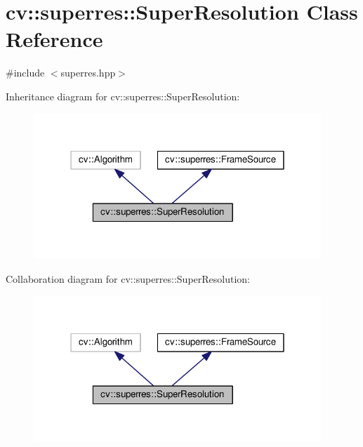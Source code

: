 \hypertarget{classcv_1_1superres_1_1SuperResolution}{\section{cv\-:\-:superres\-:\-:Super\-Resolution Class Reference}
\label{classcv_1_1superres_1_1SuperResolution}
}


{\ttfamily \#include $<$superres.\-hpp$>$}



Inheritance diagram for cv\-:\-:superres\-:\-:Super\-Resolution\-:\nopagebreak
\begin{figure}[H]
\begin{center}
\leavevmode
\includegraphics[width=307pt]{classcv_1_1superres_1_1SuperResolution__inherit__graph}
\end{center}
\end{figure}


Collaboration diagram for cv\-:\-:superres\-:\-:Super\-Resolution\-:\nopagebreak
\begin{figure}[H]
\begin{center}
\leavevmode
\includegraphics[width=307pt]{classcv_1_1superres_1_1SuperResolution__coll__graph}
\end{center}
\end{figure}
